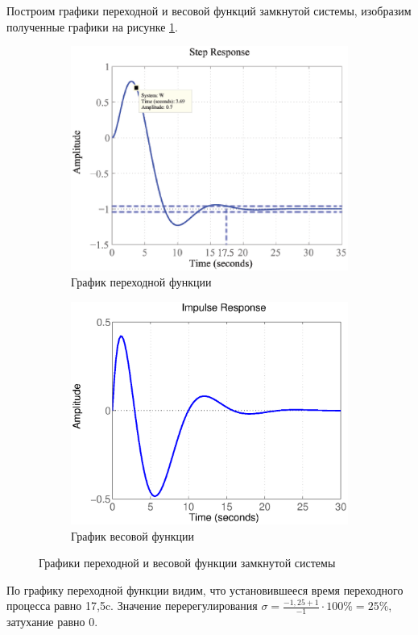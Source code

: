 \documentclass[a4paper,12pt]{article} %
\begin{document}
Построим графики переходной и весовой функций замкнутой системы, изобразим полученные графики на рисунке \ref{stepimpulse}.
\begin{figure}[H]
	\centering
	\begin{subfigure}[b]{0.48\textwidth}
	    \includegraphics[width = \textwidth]{scheme/step}
		\caption{График переходной функции}
	\end{subfigure}
	\hfill
	\begin{subfigure}[b]{0.48\textwidth}
		\includegraphics[width = \textwidth]{scheme/impulse}
		\caption{График весовой функции}
	\end{subfigure}
	\caption{Графики переходной и весовой функции замкнутой системы}
	\label{stepimpulse}
\end{figure}
По графику переходной функции видим, что установившееся время переходного процесса равно 17,5c. Значение перерегулирования $\sigma=\displaystyle{\frac{-1,25+1}{-1}\cdot100\%=25\%}$, затухание равно 0.
\end{document}
